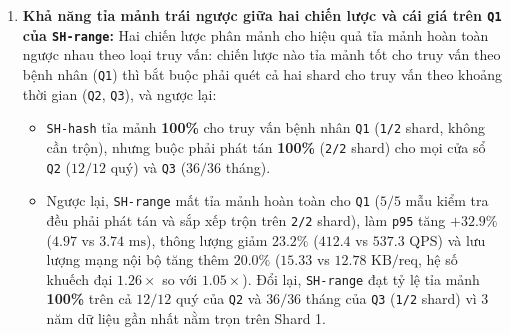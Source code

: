 \begin{enumerate}[leftmargin=0.8cm, itemsep=4pt]
  \item \textbf{Khả năng tỉa mảnh trái ngược giữa hai chiến lược và cái giá trên \texttt{Q1} của \texttt{SH-range}:} Hai chiến lược phân mảnh cho hiệu quả tỉa mảnh hoàn toàn ngược nhau theo loại truy vấn: chiến lược nào tỉa mảnh tốt cho truy vấn theo bệnh nhân (\texttt{Q1}) thì bắt buộc phải quét cả hai shard cho truy vấn theo khoảng thời gian (\texttt{Q2}, \texttt{Q3}), và ngược lại:
  \begin{itemize}[leftmargin=0.6cm, itemsep=3pt]
    \item \texttt{SH-hash} tỉa mảnh \textbf{100\%} cho truy vấn bệnh nhân \texttt{Q1} (\texttt{1/2} shard, không cần trộn), nhưng buộc phải phát tán \textbf{100\%} (\texttt{2/2} shard) cho mọi cửa sổ \texttt{Q2} ($12/12$ quý) và \texttt{Q3} ($36/36$ tháng).
    \item Ngược lại, \texttt{SH-range} mất tỉa mảnh hoàn toàn cho \texttt{Q1} ($5/5$ mẫu kiểm tra đều phải phát tán và sắp xếp trộn trên \texttt{2/2} shard), làm \texttt{p95} tăng \textbf{$+32.9\%$} ($4.97$ vs $3.74\text{ ms}$), thông lượng giảm \textbf{$23.2\%$} ($412.4$ vs $537.3\text{ QPS}$) và lưu lượng mạng nội bộ tăng thêm $20.0\%$ ($15.33$ vs $12.78\text{ KB/req}$, hệ số khuếch đại $1.26\times$ so với $1.05\times$). Đổi lại, \texttt{SH-range} đạt tỷ lệ tỉa mảnh \textbf{100\%} trên cả $12/12$ quý của \texttt{Q2} và $36/36$ tháng của \texttt{Q3} (\texttt{1/2} shard) vì 3 năm dữ liệu gần nhất nằm trọn trên Shard 1.
  \end{itemize}


\end{enumerate}

